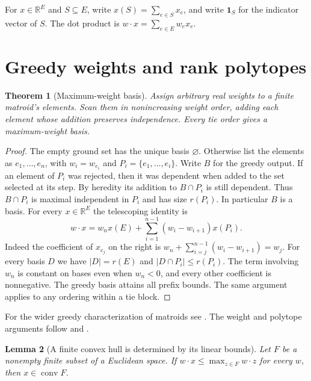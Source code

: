 \documentclass[11pt,oneside,openany]{book}
\theoremstyle{plain}
\newtheorem{theorem}{Theorem}[chapter]
\newtheorem{lemma}[theorem]{Lemma}
\theoremstyle{definition}
\theoremstyle{remark}
\begin{document}
For \(x\in\mathbb R^E\) and \(S\subseteq E\), write
\(x(S)=\sum_{e\in S}x_e\), and write \(\mathbf 1_S\) for the
indicator vector of \(S\). The dot product is
\(w\cdot x=\sum_{e\in E}w_e x_e\).

\section{Greedy weights and rank polytopes}

\begin{theorem}[Maximum-weight basis]
\label{p205:W44}
Assign arbitrary real weights to a finite matroid's elements.
Scan them in nonincreasing weight order, adding each element
whose addition preserves independence. Every tie order gives
a maximum-weight basis.
\end{theorem}

\begin{proof}
The empty ground set has the unique basis \(\varnothing\).
Otherwise list the elements as \(e_1,\ldots,e_n\), with
\(w_i=w_{e_i}\) and \(P_i=\{e_1,\ldots,e_i\}\).
Write \(B\) for the greedy output.
If an element of \(P_i\) was rejected, then it was dependent
when added to the set selected at its step. By heredity its
addition to \(B\cap P_i\) is still dependent. Thus \(B\cap P_i\)
is maximal independent in \(P_i\) and has size \(r(P_i)\).
In particular \(B\) is a basis. For every \(x\in\mathbb R^E\)
the telescoping identity is
\begin{equation}
\label{p205:matroid-prefix-sum}
w\cdot x=w_n x(E)+\sum_{i=1}^{n-1}(w_i-w_{i+1})x(P_i).
\end{equation}
Indeed the coefficient of \(x_{e_j}\) on the right is
\(w_n+\sum_{i=j}^{n-1}(w_i-w_{i+1})=w_j\).
For every basis \(D\) we have \(|D|=r(E)\) and
\(|D\cap P_i|\le r(P_i)\). The term involving \(w_n\) is constant
on bases even when \(w_n<0\), and every other coefficient is
nonnegative. The greedy basis attains all prefix bounds.
The same argument applies to any ordering within a tie block.
\end{proof}

For the wider greedy characterization of matroids see
\cite[Chapter~12, W78--W80]{p204}. The weight and polytope
arguments follow \cite[Sections~40.1--40.2]{schrijver} and
\cite[Section~1.8]{oxley}.

\begin{lemma}[A finite convex hull is determined by its linear bounds]
\label{p205:matroid-support}
Let \(F\) be a nonempty finite subset of a Euclidean space. If
\(w\cdot x\le\max_{z\in F} w\cdot z\) for every \(w\), then
\(x\in\operatorname{conv}F\).
\end{lemma}
\end{document}
